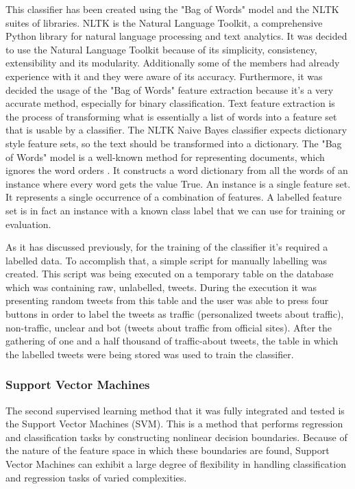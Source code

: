 This classifier has been created using the "Bag of Words" model and the NLTK suites of libraries. NLTK is the Natural Language Toolkit, a comprehensive Python library for natural language processing and text analytics. It was decided to use the Natural Language Toolkit because of its simplicity, consistency, extensibility and its modularity. Additionally some of the members had already experience with it and they were aware of its accuracy. Furthermore, it was decided the usage of the "Bag of Words" feature extraction because it's a very accurate method, especially for binary classification. Text feature extraction is the process of transforming what is essentially a list of words into a feature set that is usable by a classifier. The NLTK Naive Bayes classifier expects dictionary style feature sets, so the text should be transformed into a dictionary. The "Bag of Words" model is a well-known method for representing documents, which ignores the word orders \cite{Bird}\cite{Perkins}. It constructs a word dictionary from all the words of an instance where every word gets the value True. An instance is a single feature set. It represents a single occurrence of a combination of features. A labelled feature set is in fact an instance with a known class label that we can use for training or evaluation.

As it has discussed previously, for the training of the classifier it's required a labelled data. To accomplish that, a simple script for manually labelling was created. This script was being executed on a temporary table on the database which was containing raw, unlabelled, tweets. During the execution it was presenting random tweets from this table and the user was able to press four buttons in order to label the tweets as traffic (personalized tweets about traffic), non-traffic, unclear and bot (tweets about traffic from official sites). After the gathering of one and a half thousand of traffic-about tweets, the table in which the labelled tweets were being stored was used to train the classifier.

\subsubsection{Support Vector Machines}
The second supervised learning method that it was fully integrated and tested is the Support Vector Machines (SVM). This is a method that performs regression and classification tasks by constructing nonlinear decision boundaries. Because of the nature of the feature space in which these boundaries are found, Support Vector Machines can exhibit a large degree of flexibility in handling classification and regression tasks of varied complexities.

